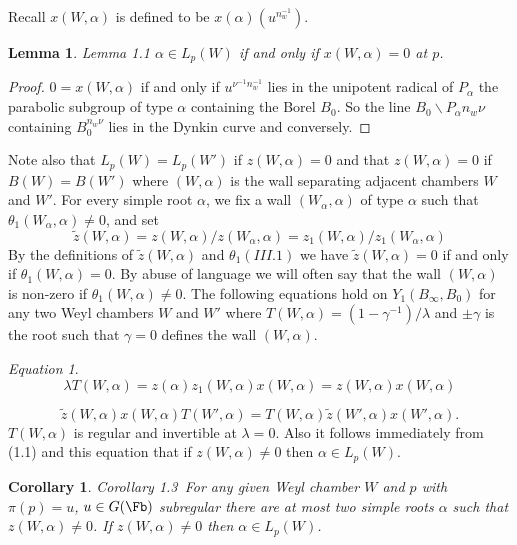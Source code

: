 \documentclass{memo-l}
\newtheorem{lemma}[theorem]{Lemma}
\newtheorem{corollary}[theorem]{Corollary}
\theoremstyle{definition}
\theoremstyle{remark}
\newtheorem{eqn}[theorem]{Equation}
\numberwithin{section}{chapter}
\numberwithin{equation}{chapter}
\begin{document}
Recall $x(W,{\alpha})$ is defined to be $x({\alpha})(u^{n_w^{-1}})$.

\begin{lemma}{Lemma 1.1} ${\alpha} \in L_{p}(W)$ if and only if
$x(W,{\alpha}) = 0$ at $p$.
\end{lemma}

\medpagebreak

\begin{proof}  $0 = x(W,{\alpha})$ if and only if $u^{\nu^{-1}n_w^{-1}}$
lies in the unipotent radical of $P_{{\alpha}}$
the parabolic subgroup of type ${\alpha}$ containing the Borel $B_{0}$.  So
the line $B_{0}\backslash P_{{\alpha}}n_{w}{\nu}$ containing $B_{0}^{n_w\nu}$
lies in the Dynkin curve and conversely.
\end{proof}

{\medskip}

   Note also that $L_{p}(W) = L_{p}(W')$ if $z(W,{\alpha}) = 0$ and that
$z(W,{\alpha}) = 0$ if $B(W) = B(W')$ where $(W,{\alpha})$ is the wall
separating adjacent chambers $W$ and $W'$.  For every simple root
${\alpha}$, we fix a wall $(W_{{\alpha}},{\alpha})$ of type ${\alpha}$ such
that ${\theta}_{1}(W_{{\alpha}},{\alpha})\ne 0$, and set
$$
\tilde{z} (W,{\alpha}) = z(W,{\alpha})/z(W_{{\alpha}},{\alpha}) =
z_{1}(W,{\alpha})/z_{1}(W_{{\alpha}},{\alpha})
$$
By the definitions of $\tilde z (W,{\alpha})$ and ${\theta}_{1} (III.1)$ we
have $\tilde z (W,{\alpha}) = 0$ if and only if ${\theta}_{1}(W,{\alpha}) =
0$.  By abuse of language we will often say that the wall $(W,{\alpha})$ is
non-zero if ${\theta}_{1}(W,{\alpha})\ne 0$.  The following equations hold
on $Y_{1}(B_{{\infty}},B_{0})$ for any two Weyl chambers $W$ and $W'$ where
$T(W,{\alpha}) = (1-{\gamma}^{-1})/{\lambda}$ and ${\pm}{\gamma}$ is
the root such that ${\gamma} = 0$ defines the wall $(W,{\alpha})$.


\begin{eqn}  %
$$
\lambda T(W,{\alpha}) = z({\alpha})z_{1}(W,{\alpha})x(W,{\alpha}) =
z(W,{\alpha})x(W,{\alpha})
$$
\end{eqn}

$$
\tilde {z} (W,{\alpha})x(W,{\alpha})T(W',{\alpha}) = T(W,{\alpha})\tilde z
(W',{\alpha})x(W',{\alpha}) .
$$
$T(W,{\alpha})$ is regular and invertible at ${\lambda} = 0$.  Also it
follows immediately from (1.1) and this equation that if
$z(W,{\alpha})\ne 0$ then ${\alpha} \in L_{p}(W)$.

\medskip

\begin{corollary}{Corollary 1.3}\ For any given Weyl chamber $W$ and $p$ with
${\pi}(p) = u$, $u \in G(\Fb)$ subregular there are at most two simple
roots ${\alpha}$ such that $z(W,{\alpha})\ne 0$.  If $z(W,{\alpha})\ne 0$
then ${\alpha} \in L_{p}(W)$.
\end{corollary}
\end{document}
